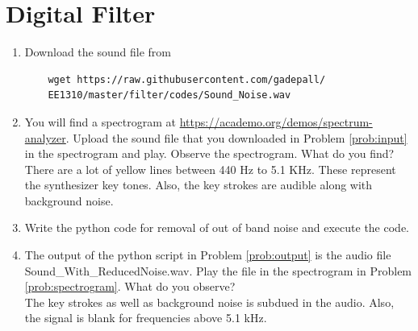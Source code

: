 \documentclass[journal,12pt,twocolumn]{IEEEtran}
\renewcommand\thesection{\arabic{section}}
\begin{document}
\section{Digital Filter}
\begin{enumerate}[label=\thesection.\arabic*
,ref=\thesection.\theenumi]
\item
\label{prob:input}
Download the sound file from  
\begin{lstlisting}
	wget https://raw.githubusercontent.com/gadepall/ 
	EE1310/master/filter/codes/Sound_Noise.wav
\end{lstlisting}
\item
\label{prob:spectrogram}
You will find a spectrogram at \href{https://academo.org/demos/spectrum-analyzer}{\url{https://academo.org/demos/spectrum-analyzer}}. 
%
Upload the sound file that you downloaded in Problem \ref{prob:input} in the spectrogram  and play.  Observe the spectrogram. What do you find?
\\
%
\solution There are a lot of yellow lines between 440 Hz to 5.1 KHz.  These represent the synthesizer key tones. Also, the key strokes
are audible along with background noise.
\item
\label{prob:output}
Write the python code for removal of out of band noise and execute the code.
\\
\solution

%
\item
The output of the python script in Problem \ref{prob:output} is the audio file Sound\_With\_ReducedNoise.wav. Play the file in the spectrogram in Problem \ref{prob:spectrogram}. What do you observe?
\\
\solution The key strokes as well as background noise is subdued in the audio.  Also,  the signal is blank for frequencies above 5.1 kHz.

\end{enumerate}
\end{document}
